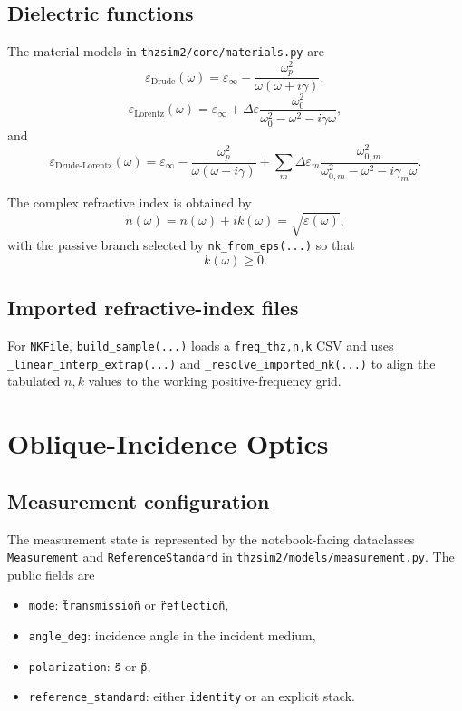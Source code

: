 \documentclass[11pt]{article}
\begin{document}
\subsection{Dielectric functions}
The material models in \texttt{thzsim2/core/materials.py} are
\[
\varepsilon_{\text{Drude}}(\omega)
=
\varepsilon_\infty
- \frac{\omega_p^2}{\omega(\omega+i\gamma)},
\]
\[
\varepsilon_{\text{Lorentz}}(\omega)
=
\varepsilon_\infty
+
\Delta\varepsilon
\frac{\omega_0^2}{\omega_0^2-\omega^2-i\gamma\omega},
\]
and
\[
\varepsilon_{\text{Drude-Lorentz}}(\omega)
=
\varepsilon_\infty
- \frac{\omega_p^2}{\omega(\omega+i\gamma)}
+
\sum_m
\Delta\varepsilon_m
\frac{\omega_{0,m}^2}{\omega_{0,m}^2-\omega^2-i\gamma_m\omega}.
\]

The complex refractive index is obtained by
\[
\tilde{n}(\omega) = n(\omega) + i k(\omega) = \sqrt{\varepsilon(\omega)},
\]
with the passive branch selected by \texttt{nk\_from\_eps(...)} so that
\[
k(\omega) \ge 0.
\]

\subsection{Imported refractive-index files}
For \texttt{NKFile}, \texttt{build\_sample(...)} loads a \texttt{freq\_thz,n,k} CSV and uses
\texttt{\_linear\_interp\_extrap(...)} and \texttt{\_resolve\_imported\_nk(...)} to align the
tabulated $n,k$ values to the working positive-frequency grid.

\section{Oblique-Incidence Optics}
\subsection{Measurement configuration}
The measurement state is represented by the notebook-facing dataclasses
\texttt{Measurement} and \texttt{ReferenceStandard} in
\texttt{thzsim2/models/measurement.py}. The public fields are
\begin{itemize}[leftmargin=2em]
\item \texttt{mode}: \texttt{\"transmission\"} or \texttt{\"reflection\"},
\item \texttt{angle\_deg}: incidence angle in the incident medium,
\item \texttt{polarization}: \texttt{\"s\"} or \texttt{\"p\"},
\item \texttt{reference\_standard}: either \texttt{identity} or an explicit stack.
\end{itemize}
\end{document}
